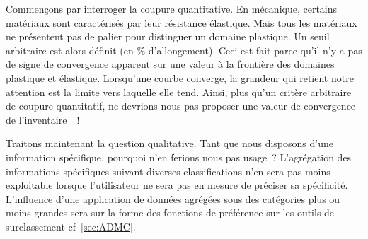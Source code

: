 Commençons par interroger la coupure quantitative.
En mécanique, certains matériaux sont caractérisés par leur résistance élastique.
Mais tous les matériaux ne présentent pas de palier pour distinguer un domaine plastique.
Un seuil arbitraire est alors définit (en \% d'allongement).
Ceci est fait parce qu'il n'y a pas de signe de convergence apparent sur une valeur à la frontière des domaines plastique et élastique.
Lorsqu'une courbe converge, la grandeur qui retient notre attention est la limite vers laquelle elle tend.
Ainsi, plus qu'un critère arbitraire de coupure quantitatif, ne devrions nous pas proposer une valeur de convergence de l'inventaire~~!
 

Traitons maintenant la question qualitative.
Tant que nous disposons d'une information spécifique, pourquoi n'en ferions nous pas usage~?
L'agrégation des informations spécifiques suivant diverses classifications n'en sera pas moins exploitable lorsque l'utilisateur ne sera pas en mesure de préciser sa spécificité.
L'influence d'une application de données agrégées sous des catégories plus ou moins grandes sera sur la forme des fonctions de préférence sur les outils de surclassement cf~\ref{sec:ADMC}.


